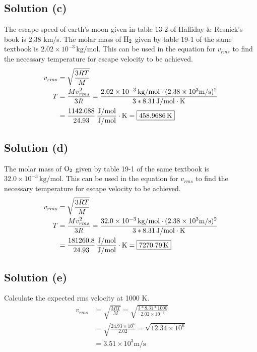 \documentclass[12pt]{article}
\newcommand{\E}[1]{\times 10^{#1}}
\begin{document}
        \subsection{Solution (c)}
            The escape speed of earth's moon given in table 13-2 of Halliday \& Resnick's book is 2.38 \unit{\kilo\meter/\second}.
            The molar mass of $\rm H_2$ given by table 19-1 of the same textbook is $2.02\E{-3}\,\unit{\kilo\gram/\mole}$.
            This can be used in the equation for $v_{rms}$ to find the necessary temperature for escape velocity to be achieved.
            \begin{align}
                v_{rms} &=  \sqrt{\frac{3RT}{M}}\\
                T   &=  \frac{M v_{rms}^2}{3R}
                    =   \frac{2.02\E{-3}\,\unit{\kilo\gram/\mole} \cdot (2.38\E{3} \unit{\meter/\second})^2}{3 * 8.31\,\unit{\joule/\mole\cdot\kelvin}}\\
                    &=  \frac{1142.088}{24.93}\,\unit{\frac{\joule/\mole}{\joule/\mole}\cdot\kelvin}
                    =   \boxed{458.9686\,\unit{\kelvin}}
            \end{align}

        \subsection{Solution (d)}
            The molar mass of $\rm O_2$ given by table 19-1 of the same textbook is $32.0\E{-3}\,\unit{\kilo\gram/\mole}$.
            This can be used in the equation for $v_{rms}$ to find the necessary temperature for escape velocity to be achieved.
            \begin{align}
                v_{rms} &=  \sqrt{\frac{3RT}{M}}\\
                T   &=  \frac{M v_{rms}^2}{3R}
                    =   \frac{32.0\E{-3}\,\unit{\kilo\gram/\mole} \cdot (2.38\E{3} \unit{\meter/\second})^2}{3 * 8.31\,\unit{\joule/\mole\cdot\kelvin}}\\
                    &=  \frac{181260.8}{24.93}\,\unit{\frac{\joule/\mole}{\joule/\mole}\cdot\kelvin}
                    =   \boxed{7270.79\,\unit{\kelvin}}
            \end{align}

        \subsection{Solution (e)}
            Calculate the expected rms velocity at 1000 \unit{\kelvin}.
            \begin{align}
                v_{rms} &=  \sqrt{\frac{3RT}{M}}
                    =   \sqrt{\frac{3 * 8.31 * 1000}{2.02\E{-3}}}\\
                    &=  \sqrt{\frac{24.93\E{6}}{2.02}}
                    =   \sqrt{12.34\E{6}}\\
                    &=  3.51\E{3} \unit{\meter/\second}
            \end{align}
\end{document}
